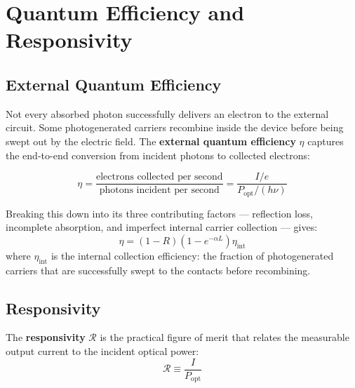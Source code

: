 \section{Quantum Efficiency and Responsivity}

\subsection{External Quantum Efficiency}

Not every absorbed photon successfully delivers an electron to the external circuit. Some photogenerated carriers recombine inside the device before being swept out by the electric field. The \textbf{external quantum efficiency} $\eta$ captures the end-to-end conversion from incident photons to collected electrons:
\begin{keyresult}
    \begin{equation}
        \eta = \frac{\text{electrons collected per second}}{\text{photons incident per second}} = \frac{I/e}{P_\text{opt}/(h\nu)}
    \end{equation}
\end{keyresult}

Breaking this down into its three contributing factors — reflection loss, incomplete absorption, and imperfect internal carrier collection — gives:
\begin{equation*}
    \eta = (1 - R)\!\left(1 - e^{-\alpha L}\right)\eta_\text{int}
\end{equation*}
where $\eta_\text{int}$ is the internal collection efficiency: the fraction of photogenerated carriers that are successfully swept to the contacts before recombining.

\subsection{Responsivity}

The \textbf{responsivity} $\mathcal{R}$ is the practical figure of merit that relates the measurable output current to the incident optical power:
\begin{equation*}
    \mathcal{R} \equiv \frac{I}{P_\text{opt}}
\end{equation*}

